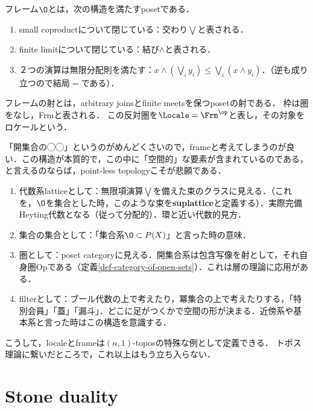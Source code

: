 \documentclass[uplatex,dvipdfmx]{jsreport}
\begin{document}
\begin{definition}\label{def-frame-and-locale}
    フレーム$\O$とは，次の構造を満たすposetである．
    \begin{enumerate}
        \item small coproductについて閉じている：交わり$\bigvee$と表される．
        \item finite limitについて閉じている：結び$\land$と表される．
        \item ２つの演算は無限分配則を満たす：$x\land(\bigvee_i y_i)\le \bigvee_i(x\land y_i)$．（逆も成り立つので結局$=$である）．
    \end{enumerate}
    フレームの射とは，arbitrary joinsとfinite meetsを保つposetの射である．
    枠は圏をなし，Frmと表される．
    この反対圏を$\Locale=\Frm^\op$と表し，その対象をロケールという．
\end{definition}
\begin{remark}[位相の見方総集結]\label{remark-perspective-on-topology}
    「開集合の◯◯」というのがめんどくさいので，frameと考えてしまうのが良い．この構造が本質的で，この中に「空間的」な要素が含まれているのである，と言えるのならば，point-less topologyこそが悲願である．
    \begin{enumerate}
        \item 代数系latticeとして：無限項演算$\bigvee$を備えた束のクラスに見える．（これを，$\O$を集合とした時，このような束を\textbf{suplattice}と定義する）．実際完備Heyting代数となる（従って分配的）．環と近い代数的見方．
        \item 集合の集合として：「集合系$\O\subset P(X)$」と言った時の意味．
        \item 圏として：poset categoryに見える．開集合系は包含写像を射として，それ自身圏Opである（定義\ref{def-category-of-open-sets}）．これは層の理論に応用がある．
        \item filterとして：ブール代数の上で考えたり，冪集合の上で考えたりする，「特別会員」「蓋」「漏斗」．どこに足がつくかで空間の形が決まる．近傍系や基本系と言った時はこの構造を意識する．
    \end{enumerate}
\end{remark}

こうして，localeとframeは$(n,1)$-toposの特殊な例として定義できる．
トポス理論に繋いだところで，これ以上はもう立ち入らない．

\section{Stone duality}\label{sec-Stone-duality}
\end{document}
